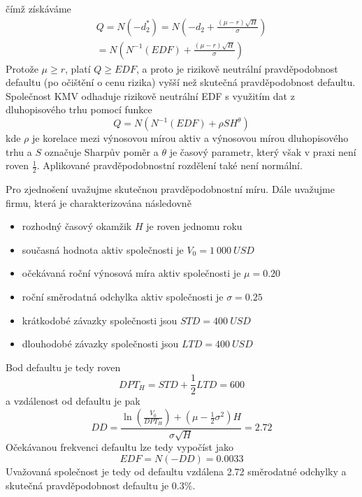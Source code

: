 čímž získáváme
\begin{multline}
Q = N(-d_2^*) = N\left(-d_2 + \frac{(\mu - r)\sqrt{H}}{\sigma}\right)\\
= N \left(N^{-1}(EDF) + \frac{(\mu - r)\sqrt{H}}{\sigma}\right)
\end{multline}
Protože $\mu \ge r$, platí $Q \ge EDF$, a proto je rizikově neutrální pravděpodobnost defaultu (po očištění o cenu rizika) vyšší než skutečná pravděpodobnost defaultu. Společnost KMV odhaduje rizikově neutrální EDF s využitím dat z dluhopisového trhu pomocí funkce
\begin{equation}
Q = N(N^{-1}(EDF) + \rho SH^{\theta})
\end{equation}
kde $\rho$ je korelace mezi výnosovou mírou aktiv a výnosovou mírou dluhopisového trhu a $S$ označuje Sharpův poměr a $\theta$ je časový parametr, který však v praxi není roven $\frac{1}{2}$. Aplikované pravděpodobnostní rozdělení také není normální.

\begin{example}
Pro zjednošení uvažujme skutečnou pravděpodobnostní míru. Dále uvažujme firmu, která je charakterizována následovně
\begin{itemize}
\item rozhodný časový okamžik $H$ je roven jednomu roku
\item současná hodnota aktiv společnosti je $V_0 = 1~000~USD$
\item očekávaná roční výnosová míra aktiv společnosti je $\mu = 0.20$
\item roční směrodatná odchylka aktiv společnosti je $\sigma = 0.25$
\item krátkodobé závazky společnosti jsou $STD = 400~USD$
\item dlouhodobé závazky společnosti jsou $LTD = 400~USD$
\end{itemize}
Bod defaultu je tedy roven
\begin{equation*}
DPT_H = STD + \frac{1}{2}LTD = 600
\end{equation*}
a vzdálenost od defaultu je pak
\begin{equation*}
DD = \frac{\ln \left(\frac{V_0}{DPT_H}\right) + \left(\mu - \frac{1}{2}\sigma^2 \right)H}{\sigma \sqrt{H}} = 2.72
\end{equation*}
Očekávanou frekvenci defaultu lze tedy vypočíst jako
\begin{equation}
EDF = N(-DD) = 0.0033
\end{equation}
Uvažovaná společnost je tedy od defaultu vzdálena 2.72 směrodatné odchylky a skutečná pravděpodobnost defaultu je 0.3\%.
\end{example}


